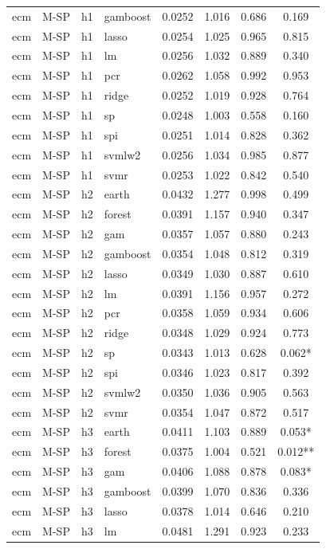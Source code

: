 \begin{ThreePartTable}
\begin{longtable}[t]{llclcccc}
ecm & M-SP & h1 & gamboost & 0.0252 & 1.016 & 0.686 & 0.169\\
ecm & M-SP & h1 & lasso & 0.0254 & 1.025 & 0.965 & 0.815\\
ecm & M-SP & h1 & lm & 0.0256 & 1.032 & 0.889 & 0.340\\
ecm & M-SP & h1 & pcr & 0.0262 & 1.058 & 0.992 & 0.953\\
ecm & M-SP & h1 & ridge & 0.0252 & 1.019 & 0.928 & 0.764\\
ecm & M-SP & h1 & sp & 0.0248 & 1.003 & 0.558 & 0.160\\
ecm & M-SP & h1 & spi & 0.0251 & 1.014 & 0.828 & 0.362\\
ecm & M-SP & h1 & svmlw2 & 0.0256 & 1.034 & 0.985 & 0.877\\
ecm & M-SP & h1 & svmr & 0.0253 & 1.022 & 0.842 & 0.540\\
\addlinespace
ecm & M-SP & h2 & earth & 0.0432 & 1.277 & 0.998 & 0.499\\
ecm & M-SP & h2 & forest & 0.0391 & 1.157 & 0.940 & 0.347\\
ecm & M-SP & h2 & gam & 0.0357 & 1.057 & 0.880 & 0.243\\
ecm & M-SP & h2 & gamboost & 0.0354 & 1.048 & 0.812 & 0.319\\
ecm & M-SP & h2 & lasso & 0.0349 & 1.030 & 0.887 & 0.610\\
ecm & M-SP & h2 & lm & 0.0391 & 1.156 & 0.957 & 0.272\\
ecm & M-SP & h2 & pcr & 0.0358 & 1.059 & 0.934 & 0.606\\
ecm & M-SP & h2 & ridge & 0.0348 & 1.029 & 0.924 & 0.773\\
ecm & M-SP & h2 & sp & 0.0343 & 1.013 & 0.628 & 0.062*\\
ecm & M-SP & h2 & spi & 0.0346 & 1.023 & 0.817 & 0.392\\
ecm & M-SP & h2 & svmlw2 & 0.0350 & 1.036 & 0.905 & 0.563\\
ecm & M-SP & h2 & svmr & 0.0354 & 1.047 & 0.872 & 0.517\\
\addlinespace
ecm & M-SP & h3 & earth & 0.0411 & 1.103 & 0.889 & 0.053*\\
ecm & M-SP & h3 & forest & 0.0375 & 1.004 & 0.521 & 0.012**\\
ecm & M-SP & h3 & gam & 0.0406 & 1.088 & 0.878 & 0.083*\\
ecm & M-SP & h3 & gamboost & 0.0399 & 1.070 & 0.836 & 0.336\\
ecm & M-SP & h3 & lasso & 0.0378 & 1.014 & 0.646 & 0.210\\
ecm & M-SP & h3 & lm & 0.0481 & 1.291 & 0.923 & 0.233\\

\end{longtable}
\end{ThreePartTable}
